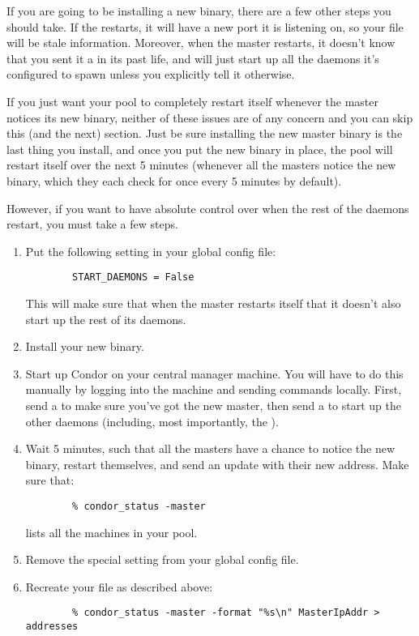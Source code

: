 If you are going to be installing a new  binary, there
are a few other steps you should take.
If the  restarts, it will have a new port it is
listening on, so your  file will be stale information.
Moreover, when the master restarts, it doesn't know that you sent it a
 in its past life, and will just start up all the daemons
it's configured to spawn unless you explicitly tell it otherwise.

If you just want your pool to completely restart itself whenever the
master notices its new binary, neither of these issues are of any
concern and you can skip this (and the next) section.
Just be sure installing the new master binary is the last thing you
install, and once you put the new binary in place, the pool will
restart itself over the next 5 minutes (whenever all the masters
notice the new binary, which they each check for once every 5 minutes
by default).

However, if you want to have absolute control over when the rest of
the daemons restart, you must take a few steps.

\begin{enumerate}
\item Put the following setting in your global config file:
\begin{verbatim}
        START_DAEMONS = False
\end{verbatim}
This will make sure that when the master restarts itself that it 
doesn't also start up the rest of its daemons.
\item Install your new  binary.
\item Start up Condor on your central manager machine.
You will have to do this manually by logging into the machine and
sending commands locally.
First, send a  to make sure you've got the new master,
then send a  to start up the other daemons (including, most
importantly, the ).
\item Wait 5 minutes, such that all the masters have a chance to
notice the new binary, restart themselves, and send an update with
their new address.  Make sure that: 
\begin{verbatim}
        % condor_status -master
\end{verbatim}
lists all the machines in your pool.
\item Remove the special setting from your global config file.
\item Recreate your  file as described above:
\begin{verbatim}
        % condor_status -master -format "%s\n" MasterIpAddr > addresses
\end{verbatim}
\end{enumerate}


